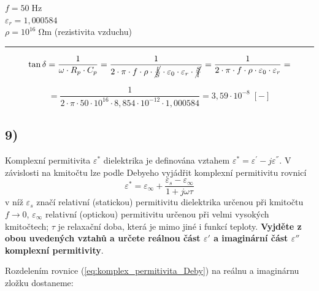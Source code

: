 
$f = 50 \; \si{\hertz}$ \\
$\varepsilon_r = 1,000584$\\
$\rho = 10^{16} \; \si{\ohm\meter}$ (rezistivita vzduchu)\\
\noindent\rule{8cm}{0.4pt}

\begin{equation*}
    \tan \delta = \frac{1}{\omega \cdot R_p \cdot C_p} = \frac{1}{2 \cdot \pi \cdot f \cdot \rho \cdot \cancel{\frac{l}{S}} \cdot \varepsilon_0 \cdot \varepsilon_r \cdot \cancel{\frac{S}{l}}} = \frac{1}{2 \cdot \pi \cdot f \cdot \rho \cdot \varepsilon_0 \cdot \varepsilon_r} = 
\end{equation*}

\begin{equation*}
    = \frac{1}{2 \cdot \pi \cdot 50 \cdot 10^{16} \cdot 8,854 \cdot 10^{-12} \cdot 1,000584} = 3,59 \cdot 10^{-8} \; [-]
\end{equation*}

\newpage


\subsection*{9)}
Komplexní permitivita $\varepsilon^*$ dielektrika je definována vztahem ${\varepsilon^{*}}={\varepsilon^{'}}-{j\varepsilon^{''}}$. V závislosti na kmitočtu lze podle Debyeho vyjádřit komplexní permitivitu rovnicí
\begin{equation}
    {\varepsilon^{*}}={\varepsilon_\infty}+\frac{{\varepsilon_s}-{\varepsilon_\infty}}{1+j\omega\tau}
    \label{eq:komplex_permitivita_Deby}
\end{equation}
v níž $\varepsilon_s$ značí relativní (statickou) permitivitu dielektrika určenou při kmitočtu $f\rightarrow 0$, $\varepsilon_\infty$ relativní (optickou) permitivitu určenou při velmi vysokých kmitočtech; $\tau$ je relaxační doba, která je mimo jiné i funkcí teploty. \textbf{Vyjděte z obou uvedených vztahů
a určete reálnou část $\varepsilon{'}$ a imaginární část $\varepsilon{''}$ komplexní permitivity}.

Rozdelením rovnice (\ref{eq:komplex_permitivita_Deby}) na reálnu a imaginárnu zložku dostaneme:

